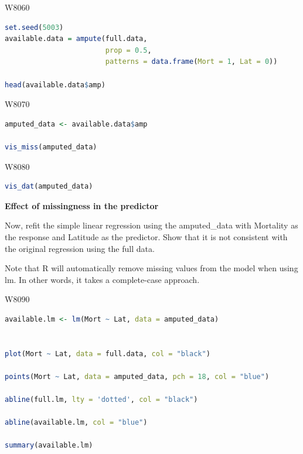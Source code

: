 
\begin{ocg}{}{W806}{0}
\begin{lstlisting}[language=R]
set.seed(5003)
available.data = ampute(full.data,
                        prop = 0.5,
                        patterns = data.frame(Mort = 1, Lat = 0))

head(available.data$amp)
\end{lstlisting}
\end{ocg}


\begin{ocg}{}{W807}{0}
\begin{lstlisting}[language=R]
amputed_data <- available.data$amp

vis_miss(amputed_data)
\end{lstlisting}
\end{ocg}


\begin{ocg}{}{W808}{0}
\begin{lstlisting}[language=R]
vis_dat(amputed_data)
\end{lstlisting}
\end{ocg}

\noindent\textbf{Effect of missingness in the predictor}

\indent 

Now, refit the simple linear regression using the amputed\_data with Mortality as the response and Latitude as the predictor. Show that it is not consistent with the original regression using the full data.

Note that R will automatically remove missing values from the model when using lm. In other words, it takes a complete-case approach.


\begin{ocg}{}{W809}{0}
\begin{lstlisting}[language=R]
available.lm <- lm(Mort ~ Lat, data = amputed_data)


plot(Mort ~ Lat, data = full.data, col = "black")

points(Mort ~ Lat, data = amputed_data, pch = 18, col = "blue")

abline(full.lm, lty = 'dotted', col = "black")

abline(available.lm, col = "blue")

summary(available.lm)
\end{lstlisting}
\end{ocg}

